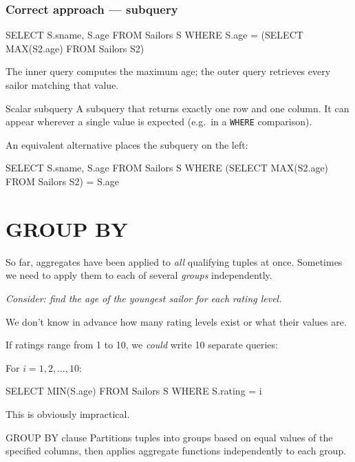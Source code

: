 \documentclass[../../dis.tex]{subfiles}
\begin{document}
\subsubsection*{Correct approach --- subquery}
\begin{sql}
    SELECT S.sname, S.age
    FROM Sailors S
    WHERE S.age = (SELECT MAX(S2.age) FROM Sailors S2)
\end{sql}
The inner query computes the maximum age; the outer query retrieves every sailor matching that value.

\begin{concept}{Scalar subquery}
A subquery that returns exactly one row and one column. It can appear wherever a single value is expected (e.g.\ in a \texttt{WHERE} comparison).
\end{concept}

An equivalent alternative places the subquery on the left:
\begin{sql}
    SELECT S.sname, S.age
    FROM Sailors S
    WHERE (SELECT MAX(S2.age) FROM Sailors S2) = S.age
\end{sql}

\section{GROUP BY}

So far, aggregates have been applied to \emph{all} qualifying tuples at once. Sometimes we need to apply them to each of several \emph{groups} independently.

\textit{Consider: find the age of the youngest sailor for each rating level.}
\begin{dashlist}
    \item We don't know in advance how many rating levels exist or what their values are.
    \item If ratings range from 1 to 10, we \emph{could} write 10 separate queries:
\end{dashlist}

For $i = 1, 2, \ldots, 10$:
\begin{sql}
    SELECT MIN(S.age) FROM Sailors S WHERE S.rating = i
\end{sql}
This is obviously impractical.

\begin{concept}{GROUP BY clause}
Partitions tuples into groups based on equal values of the specified columns, then applies aggregate functions independently to each group.
\end{concept}
\end{document}
